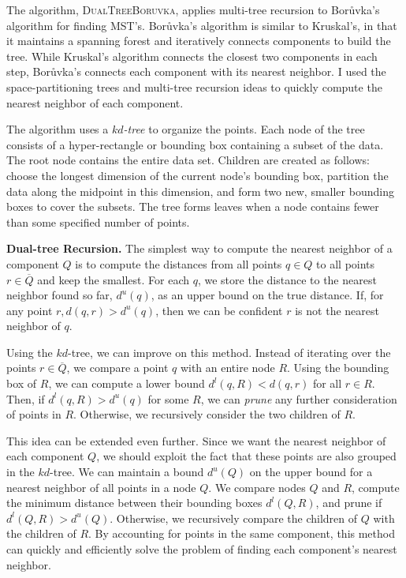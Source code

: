 \documentclass[twoside,leqno, 12pt]{article}
\begin{document}
The algorithm, \textsc{DualTreeBoruvka}, applies multi-tree recursion to Bor\r{u}vka's algorithm for finding MST's.  Bor\r{u}vka's algorithm is similar to Kruskal's, in that it maintains a spanning forest and iteratively connects components to build the tree.  While Kruskal's algorithm connects the closest two components in each step, Bor\r{u}vka's connects each component with its nearest neighbor.  I used the space-partitioning trees and multi-tree recursion ideas to quickly compute the nearest neighbor of each component.  

The algorithm uses a \emph{$kd$-tree} to organize the points.   Each node of the tree consists of a hyper-rectangle or bounding box containing a subset of the data.  The root node contains the entire data set.  Children are created as follows: choose the longest dimension of the current node's bounding box, partition the data along the midpoint in this dimension, and form two new, smaller bounding boxes to cover the subsets.  The tree forms leaves when a node contains fewer than some specified number of points.  

\textbf{Dual-tree Recursion.}  The simplest way to compute the nearest neighbor of a component $Q$ is to compute the distances from all points $q \in Q$ to all points $r \in \overline{Q}$ and keep the smallest.  For each $q$, we store the distance to the nearest neighbor found so far, $d^u(q)$, as an upper bound on the true distance.  If, for any point $r, d(q, r) > d^u(q)$, then we can be confident $r$ is not the nearest neighbor of $q$. 

Using the $kd$-tree, we can improve on this method.  Instead of iterating over the points $r \in \overline{Q}$, we compare a point $q$ with an entire node $R$.  Using the bounding box of $R$, we can compute a lower bound $d^l(q, R) < d(q, r)$ for all $r \in R$.  Then, if $d^l(q, R) > d^u(q)$ for some $R$, we can \emph{prune} any further consideration of points in $R$.  Otherwise, we recursively consider the two children of $R$.

This idea can be extended even further.  Since we want the nearest neighbor of each component $Q$, we should exploit the fact that these points are also grouped in the $kd$-tree.  We can maintain a bound $d^u(Q)$ on the upper bound for a nearest neighbor of all points in a node $Q$.  We compare nodes $Q$ and $R$, compute the minimum distance between their bounding boxes $d^l(Q,R)$, and prune if $d^l(Q, R) > d^u(Q)$.  Otherwise, we recursively compare the children of $Q$ with the children of $R$.  By accounting for points in the same component, this method can quickly and efficiently solve the problem of finding each component's nearest neighbor.  
\end{document}
